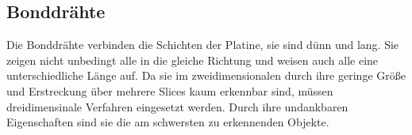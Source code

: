 \subsection{Bonddrähte}
Die Bonddrähte verbinden die Schichten der Platine, sie sind dünn und lang. Sie zeigen nicht unbedingt alle in die gleiche Richtung und weisen auch alle eine unterschiedliche Länge auf. Da sie im zweidimensionalen durch ihre geringe Größe und Erstreckung über mehrere Slices kaum erkennbar sind, müssen dreidimensinale Verfahren eingesetzt werden. Durch ihre undankbaren Eigenschaften sind sie die am schwersten zu erkennenden Objekte.